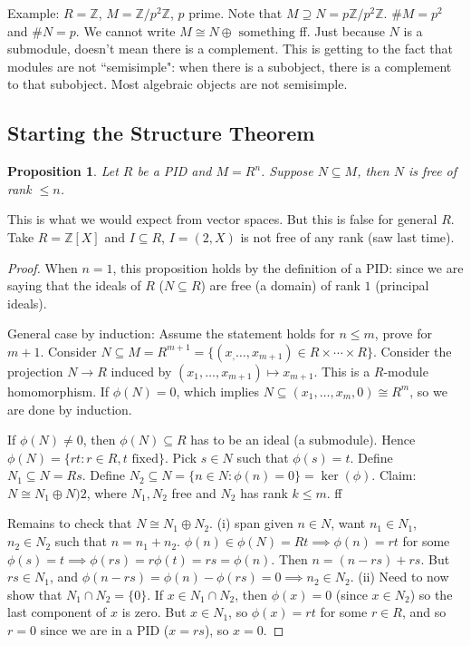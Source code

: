 \documentclass{article}
\theoremstyle{plain}
\newtheorem{proposition}{Proposition}
\theoremstyle{remark}
\newcommand{\Z}{{\mathbb Z}}
\begin{document}
Example: $R = \Z$, $M = \Z/p^2\Z$, $p$ prime.
Note that $M \supseteq N = p\Z/p^2\Z$.
$\#M = p^2$ and $\#N = p$.
We cannot write $M \cong N \oplus \text{ something}$ ff.
Just because $N$ is a submodule, doesn't mean there is a complement.
This is getting to the fact that modules are not ``semisimple":
when there is a subobject, there is a complement to that subobject.
Most algebraic objects are not semisimple.

\subsection{Starting the Structure Theorem}
\begin{proposition}
	Let $R$ be a PID and $M = R^n$.
	Suppose $N \subseteq M$, then $N$ is free of rank $\leq n$.
\end{proposition}
This is what we would expect from vector spaces.
But this is false for general $R$.
Take $R = \Z[X]$ and $I \subseteq R$, $I = (2,X)$ is not free of any rank (saw last time).

\begin{proof}
	When $n = 1$, this proposition holds by the definition of a PID:
	since we are saying that the ideals of $R$ ($N \subseteq R$)
	are free (a domain) of rank $1$ (principal ideals).

	General case by induction:
	Assume the statement holds for $n \leq m$, prove for $m + 1$.
	Consider $N \subseteq M = R^{m+1} = \{(x_,\dots,x_{m+1}) \in R \times \cdots \times R\}$.
	Consider the projection $N \to R$ induced by $(x_1,\dots,x_{m+1}) \mapsto x_{m+1}$.
	This is a $R$-module homomorphism.
	If $\phi(N) = 0$, which implies $N \subseteq (x_1,\dots,x_m,0) \cong R^m$,
	so we are done by induction.

	If $\phi(N) \neq 0$, then $\phi(N) \subseteq R$ has to be an ideal (a submodule).
	Hence $\phi(N) = \{rt \colon r \in R, t \text{ fixed}\}$.
	Pick $s \in N$ such that $\phi(s) = t$.
	Define $N_1 \subseteq N = Rs$.
	Define $N_2 \subseteq N = \{n \in N \colon \phi(n) = 0\} = \ker(\phi)$.
	Claim: $N \cong N_1 \oplus N)2$, where $N_1,N_2$ free and $N_2$ has
	rank $k \leq m$.
	ff

	Remains to check that $N \cong N_1 \oplus N_2$.
	(i) span given $n \in N$, want $n_1 \in N_1$, $n_2 \in N_2$
	such that $n = n_1 + n_2$.
	$\phi(n) \in \phi(N) = Rt \implies \phi(n) = rt$ for some
	$\phi(s) = t \implies \phi(rs) = r\phi(t) = rs = \phi(n)$.
	Then $n = (n - rs) + rs$.
	But $rs \in N_1$, and $\phi(n-rs) = \phi(n) - \phi(rs) = 0 \implies n_2 \in N_2$.
	(ii) Need to now show that $N_1 \cap N_2 = \{0\}$.
	If $x \in N_1 \cap N_2$, then $\phi(x) = 0$ (since $x \in N_2$)
	so the last component of $x$ is zero.
	But $x \in N_1$, so $\phi(x) = rt$ for some $r \in R$,
	and so $r = 0$ since we are in a PID ($x = rs$),
	so $x = 0$.
\end{proof}
\end{document}
